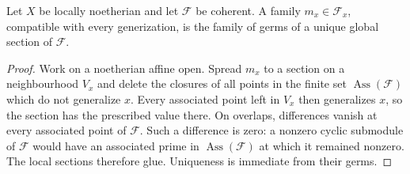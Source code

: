 \begin{lemma}
\label{lem:C-RD9-coherent}
Let $X$ be locally noetherian and let $\mathcal F$ be coherent.
A family $m_x\in\mathcal F_x$, compatible with every generization,
is the family of germs of a unique global section of $\mathcal F$.
\end{lemma}
\begin{proof}
Work on a noetherian affine open. Spread $m_x$ to a section on a
neighbourhood $V_x$ and delete the closures of all points in the finite
set $\operatorname{Ass}(\mathcal F)$ which do not generalize $x$.
Every associated point left in $V_x$ then generalizes $x$, so the
section has the prescribed value there. On overlaps, differences
vanish at every associated point of $\mathcal F$. Such a difference
is zero: a nonzero cyclic submodule of $\mathcal F$ would have an
associated prime in $\operatorname{Ass}(\mathcal F)$ at which it
remained nonzero. The local sections therefore glue. Uniqueness is
immediate from their germs.
\end{proof}


